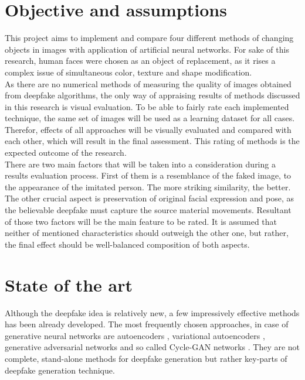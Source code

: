\section{Objective and assumptions}
\label{Objective and assumptions}
This project aims to implement and compare four different methods of changing objects in images with application of artificial neural networks. For sake of this research, human faces were chosen as an object of replacement, as it rises a complex issue of simultaneous color, texture and shape modification.\\

As there are no numerical methods of measuring the quality of images obtained from deepfake algorithms, the only way of appraising results of methods discussed in this research is visual evaluation. To be able to fairly rate each implemented technique, the same set of images will be used as a learning dataset for all cases. Therefor, effects of all approaches will be visually evaluated and compared with each other, which will result in the final assessment. This rating of methods is the expected outcome of the research.\\

There are two main factors that will be taken into a consideration during a results evaluation process. First of them is a resemblance of the faked image, to the appearance of the imitated person. The more striking similarity, the better. The other crucial aspect is preservation of original facial expression and pose, as the believable deepfake must capture the source material movements. Resultant of those two factors will be the main feature to be rated. It is assumed that neither of mentioned characteristics should outweigh the other one, but rather, the final effect should be well-balanced composition of both aspects.

\section{State of the art}
Although the deepfake idea is relatively new, a few impressively effective methods has been already developed. The most frequently chosen approaches, in case of generative neural networks are autoencoders \cite{autoencoders_bib}, variational autoencoders \cite{variational_bayes_bib} \cite{vae_loss_bib}, generative adversarial networks \cite{autoencoding_beyond_pixels_bib} \cite{U_GAT_IT_bib} and so called Cycle-GAN networks \cite{cycleGAN_1_bib} \cite{cycleGAN_2_bib} \cite{cycleGAN_3_bib}. They are not complete, stand-alone methods for deepfake generation but rather key-parts of deepfake generation technique.\\

